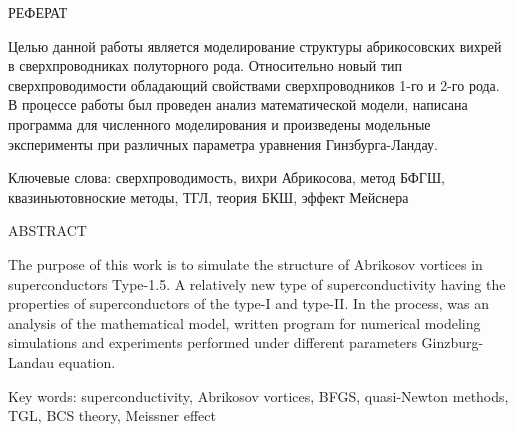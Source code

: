 \begin{center}
	РЕФЕРАТ
\end{center}

Целью данной работы является моделирование структуры абрикосовских вихрей в 
сверхпроводниках полуторного рода. Относительно новый тип сверхпроводимости 
обладающий свойствами сверхпроводников 1-го и 2-го рода. В процессе работы был 
проведен анализ математической модели, написана программа для численного 
моделирования и произведены модельные эксперименты при различных параметра 
уравнения Гинзбурга-Ландау.
\vspace*{1cm}

\noindent Ключевые слова: сверхпроводимость, вихри Абрикосова, метод БФГШ, 
квазиньютовноские методы, ТГЛ, теория БКШ, эффект Мейснера
\vspace*{1cm}

\begin{center}
    ABSTRACT
\end{center}

The purpose of this work is to simulate the structure of Abrikosov vortices in
superconductors Type-1.5. A relatively new type of superconductivity
having the properties of superconductors of the type-I and type-II. In the 
process, was an analysis of the mathematical model, written program for 
numerical modeling simulations and experiments performed under different 
parameters Ginzburg-Landau equation.

\vspace*{1cm}

\noindent Key words: superconductivity, Abrikosov vortices, BFGS, quasi-Newton 
methods, TGL, BCS theory, Meissner effect

\newpage